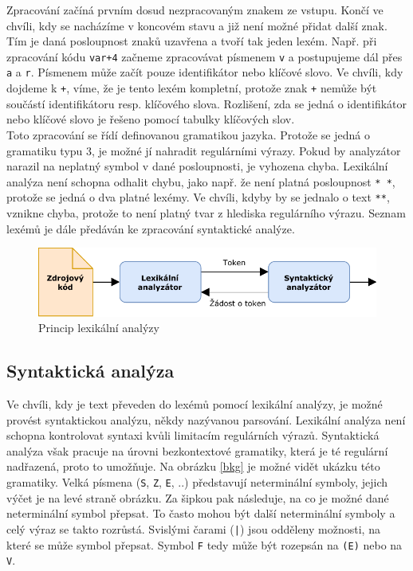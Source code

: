 			Zpracování začíná prvním dosud nezpracovaným znakem ze vstupu. Končí ve chvíli, kdy se nacházíme v koncovém stavu a již není možné přidat další znak. Tím je daná posloupnost znaků uzavřena a tvoří tak jeden lexém. Např. při zpracování kódu \texttt{var+4} začneme zpracovávat písmenem \texttt{v} a postupujeme dál přes \texttt{a} a \texttt{r}. Písmenem může začít pouze identifikátor nebo klíčové slovo. Ve chvíli, kdy dojdeme k \texttt{+}, víme, že je tento lexém kompletní, protože znak \texttt{+} nemůže být součástí identifikátoru resp. klíčového slova. Rozlišení, zda se jedná o identifikátor nebo klíčové slovo je řešeno pomocí tabulky klíčových slov.\\
			
			Toto zpracování se řídí definovanou gramatikou jazyka. Protože se jedná o gramatiku typu 3, je možné jí nahradit regulárními výrazy. Pokud by analyzátor narazil na neplatný symbol v dané posloupnosti, je vyhozena chyba. Lexikální analýza není schopna odhalit chybu, jako např. že není platná posloupnost \texttt{* *}, protože se jedná o dva platné lexémy. Ve chvíli, kdyby by se jednalo o text \texttt{**}, vznikne chyba, protože to není platný tvar z hlediska regulárního výrazu. Seznam lexémů je dále předáván ke zpracování syntaktické analýze.
			
				\begin{figure}[!htb]
						\centering
						\includegraphics[width=1\textwidth]{img/lexicalAnalysis.pdf}
						\caption[lexicalAnalysis]{Princip lexikální analýzy}
						\label{lexicalAnalysis}
					\endminipage\hfill
				\end{figure}			
			
		\subsection{Syntaktická analýza}
			Ve chvíli, kdy je text převeden do lexémů pomocí lexikální analýzy, je možné provést syntaktickou analýzu, někdy nazývanou parsování. Lexikální analýza není schopna kontrolovat syntaxi kvůli limitacím regulárních výrazů. Syntaktická analýza však pracuje na úrovni bezkontextové gramatiky, která je té regulární nadřazená, proto to umožňuje. Na obrázku \ref{bkg} je možné vidět ukázku této gramatiky. Velká písmena (\texttt{S}, \texttt{Z}, \texttt{E}, ..) představují neterminální symboly, jejich výčet je na levé straně obrázku. Za šipkou pak následuje, na co je možné dané neterminální symbol přepsat. To často mohou být další neterminální symboly a celý výraz se takto rozrůstá. Svislými čarami (\texttt{|}) jsou odděleny možnosti, na které se může symbol přepsat. Symbol \texttt{F} tedy může být rozepsán na \texttt{(E)} nebo na \texttt{V}.\\
			
